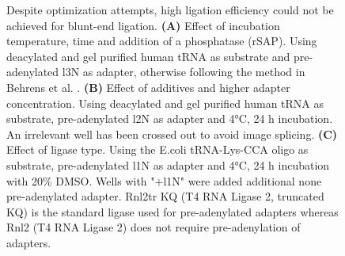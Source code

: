 \begin{figure}[ht]
    \centering
    \caption[tRNA-adapter blunt-end ligation attempted optimization.]{
    Despite optimization attempts, high ligation efficiency could not be achieved for blunt-end ligation. 
    \textbf{(A)} Effect of incubation temperature, time and addition of a phosphatase (rSAP).
    Using deacylated and gel purified human tRNA as substrate and pre-adenylated l3N as adapter, otherwise following the method in Behrens et al. \cite{Behrens2021-gb}.
    \textbf{(B)} Effect of additives and higher adapter concentration.
    Using deacylated and gel purified human tRNA as substrate, pre-adenylated l2N as adapter and 4°C, 24 h incubation.
    An irrelevant well has been crossed out to avoid image splicing.
    \textbf{(C)} Effect of ligase type.
    Using the E.coli tRNA-Lys-CCA oligo as substrate, pre-adenylated l1N as adapter and 4°C, 24 h incubation with 20\% DMSO.
    Wells with "+l1N" were added additional none pre-adenylated adapter.
    Rnl2tr KQ (T4 RNA Ligase 2, truncated KQ) is the standard ligase used for pre-adenylated adapters whereas Rnl2 (T4 RNA Ligase 2) does not require pre-adenylation of adapters.
    }
    \label{ch5:figsupp:f2S3}
\end{figure}



